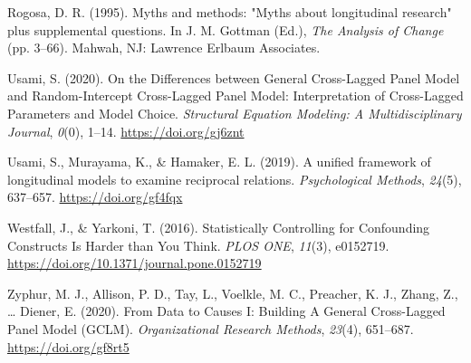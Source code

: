 \documentclass[
  english,
  man,floatsintext]{apa6}
\newlength{\cslhangindent}
\newlength{\cslentryspacingunit} %
\newenvironment{CSLReferences}[2] %
 {%
  \setlength{\parindent}{0pt}
  \ifodd #1
  \let\oldpar\par
  \def\par{\hangindent=\cslhangindent\oldpar}
  \fi
  \setlength{\parskip}{#2\cslentryspacingunit}
 }%
 {}
\begin{document}
\begin{CSLReferences}{1}{0}
\leavevmode{}%
Rogosa, D. R. (1995). Myths and methods: "{Myths} about longitudinal research" plus supplemental questions. In J. M. Gottman (Ed.), \emph{The {Analysis} of {Change}} (pp. 3--66). {Mahwah, NJ}: {Lawrence Erlbaum Associates}.

\leavevmode{}%
Usami, S. (2020). On the {Differences} between {General Cross-Lagged Panel Model} and {Random-Intercept Cross-Lagged Panel Model}: {Interpretation} of {Cross-Lagged Parameters} and {Model Choice}. \emph{Structural Equation Modeling: A Multidisciplinary Journal}, \emph{0}(0), 1--14. \url{https://doi.org/gj6znt}

\leavevmode{}%
Usami, S., Murayama, K., \& Hamaker, E. L. (2019). A unified framework of longitudinal models to examine reciprocal relations. \emph{Psychological Methods}, \emph{24}(5), 637--657. \url{https://doi.org/gf4fqx}

\leavevmode{}%
Westfall, J., \& Yarkoni, T. (2016). Statistically {Controlling} for {Confounding Constructs Is Harder} than {You Think}. \emph{PLOS ONE}, \emph{11}(3), e0152719. \url{https://doi.org/10.1371/journal.pone.0152719}

\leavevmode{}%
Zyphur, M. J., Allison, P. D., Tay, L., Voelkle, M. C., Preacher, K. J., Zhang, Z., \ldots{} Diener, E. (2020). From {Data} to {Causes I}: {Building A General Cross-Lagged Panel Model} ({GCLM}). \emph{Organizational Research Methods}, \emph{23}(4), 651--687. \url{https://doi.org/gf8rt5}

\end{CSLReferences}


\clearpage
\makeatletter
\efloat@restorefloats
\makeatother
\end{document}
